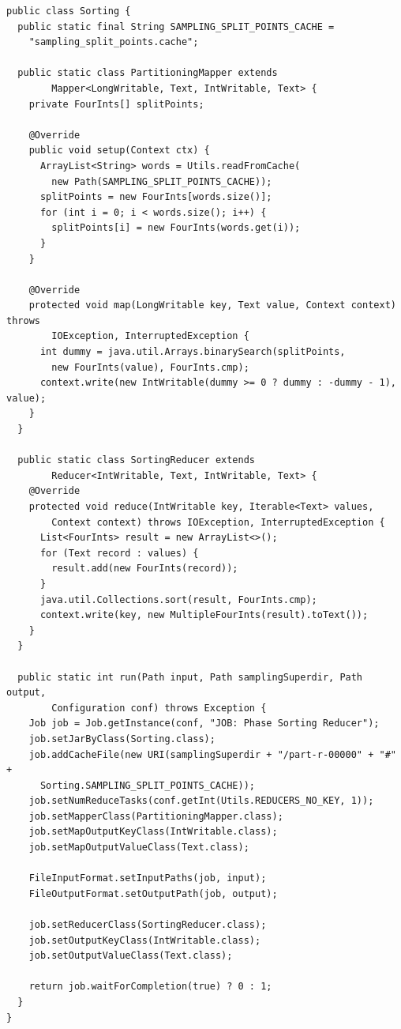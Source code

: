 \documentclass[magisterska]{pracamgr}
\begin{document}
\begin{lstlisting}[language=SmallJava,firstnumber=1,label=list_sorting,caption=Faza sortowania danych]
public class Sorting {
  public static final String SAMPLING_SPLIT_POINTS_CACHE =
    "sampling_split_points.cache";

  public static class PartitioningMapper extends
        Mapper<LongWritable, Text, IntWritable, Text> {
    private FourInts[] splitPoints;

    @Override
    public void setup(Context ctx) {
      ArrayList<String> words = Utils.readFromCache(
        new Path(SAMPLING_SPLIT_POINTS_CACHE));
      splitPoints = new FourInts[words.size()];
      for (int i = 0; i < words.size(); i++) {
        splitPoints[i] = new FourInts(words.get(i));
      }
    }

    @Override
    protected void map(LongWritable key, Text value, Context context) throws
        IOException, InterruptedException {
      int dummy = java.util.Arrays.binarySearch(splitPoints,
        new FourInts(value), FourInts.cmp);
      context.write(new IntWritable(dummy >= 0 ? dummy : -dummy - 1), value);
    }
  }

  public static class SortingReducer extends
        Reducer<IntWritable, Text, IntWritable, Text> {
    @Override
    protected void reduce(IntWritable key, Iterable<Text> values,
        Context context) throws IOException, InterruptedException {
      List<FourInts> result = new ArrayList<>();
      for (Text record : values) {
        result.add(new FourInts(record));
      }
      java.util.Collections.sort(result, FourInts.cmp);
      context.write(key, new MultipleFourInts(result).toText());
    }
  }

  public static int run(Path input, Path samplingSuperdir, Path output,
        Configuration conf) throws Exception {
    Job job = Job.getInstance(conf, "JOB: Phase Sorting Reducer");
    job.setJarByClass(Sorting.class);
    job.addCacheFile(new URI(samplingSuperdir + "/part-r-00000" + "#" +
      Sorting.SAMPLING_SPLIT_POINTS_CACHE));
    job.setNumReduceTasks(conf.getInt(Utils.REDUCERS_NO_KEY, 1));
    job.setMapperClass(PartitioningMapper.class);
    job.setMapOutputKeyClass(IntWritable.class);
    job.setMapOutputValueClass(Text.class);

    FileInputFormat.setInputPaths(job, input);
    FileOutputFormat.setOutputPath(job, output);

    job.setReducerClass(SortingReducer.class);
    job.setOutputKeyClass(IntWritable.class);
    job.setOutputValueClass(Text.class);

    return job.waitForCompletion(true) ? 0 : 1;
  }
}
\end{lstlisting}
\end{document}
